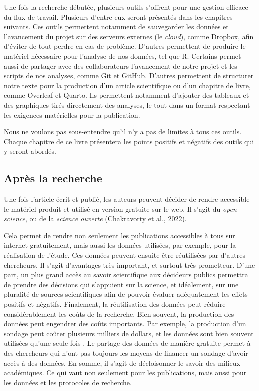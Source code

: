 \documentclass[
  letterpaper,
  DIV=11,
  numbers=noendperiod]{scrreprt}
\begin{document}
Une fois la recherche débutée, plusieurs outils s'offrent pour une
gestion efficace du flux de travail. Plusieurs d'entre eux seront
présentés dans les chapitres suivants. Ces outils permettent notamment
de sauvegarder les données et l'avancement du projet sur des serveurs
externes (le \emph{cloud}), comme Dropbox, afin d'éviter de tout perdre
en cas de problème. D'autres permettent de produire le matériel
nécessaire pour l'analyse de nos données, tel que R. Certains permet
aussi de partager avec des collaborateurs l'avancement de notre projet
et les scripts de nos analyses, comme Git et GitHub. D'autres permettent
de structurer notre texte pour la production d'un article scientifique
ou d'un chapitre de livre, comme Overleaf et Quarto. Ils permettent
notamment d'ajouter des tableaux et des graphiques tirés directement des
analyses, le tout dans un format respectant les exigences matérielles
pour la publication.

Nous ne voulons pas sous-entendre qu'il n'y a pas de limites à tous ces
outils. Chaque chapitre de ce livre présentera les points positifs et
négatifs des outils qui y seront abordés.

\subsection{Après la recherche}\label{apruxe8s-la-recherche}

Une fois l'article écrit et publié, les auteurs peuvent décider de
rendre accessible le matériel produit et utilisé en version gratuite sur
le web. Il s'agit du \emph{open science}, ou de la \emph{science
ouverte} (Chakravorty et al., 2022).

Cela permet de rendre non seulement les publications accessibles à tous
sur internet gratuitement, mais aussi les données utilisées, par
exemple, pour la réalisation de l'étude. Ces données peuvent ensuite
être réutilisées par d'autres chercheurs. Il s'agit d'avantages très
important, et surtout très prometteur. D'une part, un plus grand accès
au savoir scientifique aux décideurs publics permettra de prendre des
décisions qui s'appuient sur la science, et idéalement, sur une
pluralité de sources scientifiques afin de pouvoir évaluer adéquatement
les effets positifs et négatifs. Finalement, la réutilisation des
données peut réduire considérablement les coûts de la recherche. Bien
souvent, la production des données peut engendrer des coûts importants.
Par exemple, la production d'un sondage peut coûter plusieurs milliers
de dollars, et les données sont bien souvent utilisées qu'une seule fois
. Le partage des données de manière gratuite permet à des chercheurs qui
n'ont pas toujours les moyens de financer un sondage d'avoir accès à des
données. En somme, il s'agit de décloisonner le savoir des milieux
académiques. Ce qui vaut non seulement pour les publications, mais aussi
pour les données et les protocoles de recherche.
\end{document}
